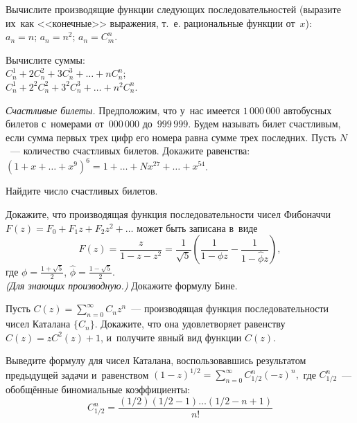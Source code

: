 \begin{problems}

\item
Вычислите производящие функции следующих последовательностей
(выразите их~как <<конечные>> выражения, т.~е. рациональные функции от~$x$):
\\[0.2ex]
\sbp $a_n = n$;
\qquad
\sbp $a_n = n^2$;
\qquad
\sbp $a_n = C_m^n$.

\item
Вычислите суммы:
\\[0.2ex]
\sbp $C_n^1 + 2 C_n^2 + 3 C_n^3 + \ldots + n C_n^n$;
\\[0.3ex]
\sbp $C_n^1 + 2^2 C_n^2 + 3^2 C_n^3 + \ldots + n^2 C_n^n$.

\item\emph{Счастливые билеты.}
Предположим, что у~нас имеется $1\,000\,000$ автобусных билетов с~номерами
от~$000\,000$ до~$999\,999$.
Будем называть билет счастливым, если сумма первых трех цифр его номера равна
сумме трех последних.
Пусть $N$~--- количество счастливых билетов.
Докажите равенства:
\\[0.2ex]
\sbp
\(
    (1 + x + \ldots + x^9)^6
=
    1 + \ldots + N x^{27} + \ldots + x^{54}
\).

\item
Найдите число счастливых билетов.

\item
Докажите, что производящая функция последовательности чисел Фибоначчи
$F(z) = F_0 + F_1 z + F_2 z^2 + \ldots$ может быть записана в~виде
\[
    F(z)
=
    \frac{z}{1 - z - z^2}
=
    \frac{1}{\sqrt{5}}
    \left(
        \frac{1}{1 - \phi z} - \frac{1}{1 - \widehat{\phi} z}
    \right)
,\]
где
$\phi = \frac{1 + \sqrt{5}}{2}$,
$\widehat{\phi} = \frac{1 - \sqrt{5}}{2}$.
\\
\emph{(Для знающих производную.)} Докажите формулу Бине.

\item
Пусть
\(
    C(z)
=
    \sum\limits_{n = 0}^{\infty}
        C_n z^n
\)~--- производящая функция последовательности чисел Каталана $\{C_n\}$.
Докажите, что она удовлетворяет равенству $C(z) = z C^2(z) + 1$, и~получите
явный вид функции $C(z)$.

\item
Выведите формулу для чисел Каталана,
воспользовавшись результатом предыдущей задачи и~равенством
\(
    (1 - z)^{1/2}
=
    \sum\limits_{n=0}^{\infty}
        C_{1/2}^n (-z)^n
,\)
где $C_{1/2}^n$~--- обобщённые биномиальные коэффициенты:
\[
    C_{1/2}^n
=
    \frac{
        (1/2) (1/2 - 1) \ldots (1/2 - n + 1 )
    }{n!}
\]

\end{problems}

